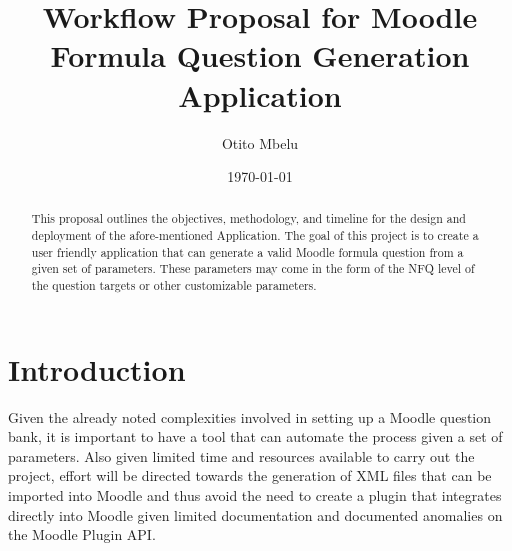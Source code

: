 \documentclass[a4paper, 12pt]{article}
\title{Workflow Proposal for Moodle Formula Question Generation Application}
\author{Otito Mbelu}
\date{\today}
\begin{document}
\maketitle

\begin{abstract}
This proposal outlines the objectives, methodology, and timeline for the design and deployment of the afore-mentioned Application. 
The goal of this project is to create a user friendly application that can generate a valid Moodle formula question from a given set of 
parameters. These parameters may come in the form of the NFQ level of the question targets or other customizable parameters.  
\end{abstract}

\tableofcontents
\newpage

\section{Introduction}
Given the already noted complexities involved in setting up a Moodle question bank, it is important to have a tool that can automate the process
given a set of parameters. Also given limited time and resources available to carry out the project, effort will be directed towards the generation 
of XML files that can be imported into Moodle and thus avoid the need to create a plugin that integrates directly into Moodle given limited documentation
and documented anomalies on the Moodle Plugin API. 
\end{document}
